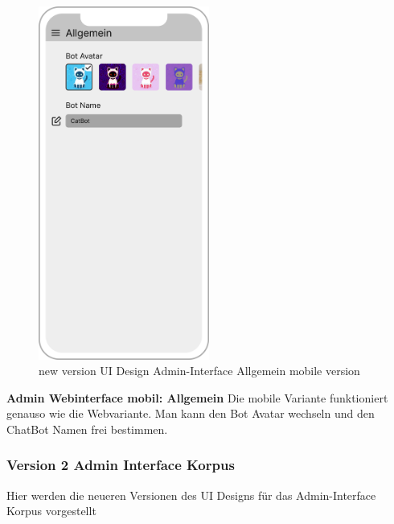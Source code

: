 \begin{figure}[H]
    \centering
    \includegraphics[width=0.5\textwidth]{bilder/new vers. UI Design/Allgemein/iPhone X Allgemein III.png}
    \caption{new version UI Design Admin-Interface Allgemein mobile version}
    \label{fig:new version UI Design Admin-Interface Allgemein mobile version}
\end{figure}
\noindent \textbf{Admin Webinterface mobil: Allgemein} \newline
Die mobile Variante funktioniert genauso wie die Webvariante. Man kann den Bot Avatar wechseln und den
ChatBot Namen frei bestimmen.

\newpage

\subsubsection{Version 2 Admin Interface Korpus}
Hier werden die neueren Versionen des UI Designs für das Admin-Interface Korpus vorgestellt

